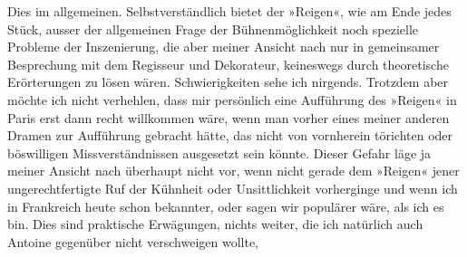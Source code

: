 \pstart
           Dies im allgemeinen. Selbstverständlich bietet der »Reigen«, wie am Ende jedes Stück, ausser der allgemeinen Frage der
               Bühnenmöglichkeit noch spezielle Probleme der Inszenierung, die aber meiner Ansicht
               nach nur in gemeinsamer Besprechung mit dem Regisseur und Dekorateur, keineswegs
               durch theoretische Erörterungen zu lösen wären. Schwierigkeiten sehe ich nirgends.
               Trotzdem aber möchte ich nicht verhehlen, dass mir persönlich eine Aufführung des
                  »Reigen« in Paris erst dann recht willkommen wäre, wenn man vorher eines meiner anderen
               Dramen zur Aufführung gebracht hätte, das nicht von vornherein törichten oder
               böswilligen Missverständnissen ausgesetzt sein könnte. Dieser Gefahr läge ja meiner
               Ansicht nach überhaupt nicht vor, wenn nicht gerade dem »Reigen« jener ungerechtfertigte Ruf der Kühnheit oder
               Unsittlichkeit vorherginge und wenn ich in Frankreich heute schon bekannter, oder sagen wir populärer wäre, als ich es
               bin. Dies sind praktische Erwägungen, nichts weiter, die ich natürlich auch Antoine gegenüber nicht verschweigen wollte,
